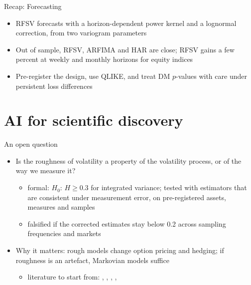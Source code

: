 \begin{frame}{Recap: Forecasting}
\itemsize{\small}
\begin{itemize}
    \item RFSV forecasts with a horizon-dependent power kernel and a lognormal correction, from two variogram parameters
    \item Out of sample, RFSV, ARFIMA and HAR are close; RFSV gains a few percent at weekly and monthly horizons for equity indices
    \item Pre-register the design, use QLIKE, and treat DM $p$-values with care under persistent loss differences
\end{itemize}
\end{frame}


\section{AI for scientific discovery}

\begin{frame}{An open question}
\itemsize{\small}
\begin{itemize}
    \item Is the roughness of volatility a property of the volatility process, or of the way we measure it?
    \begin{itemize}
        \item formal: $H_0$: $H \ge 0.3$ for integrated variance; tested with estimators that are consistent under measurement error, on pre-registered assets, measures and samples
        \item falsified if the corrected estimates stay below 0.2 across sampling frequencies and markets
    \end{itemize}
    \item Why it matters: rough models change option pricing and hedging; if roughness is an artefact, Markovian models suffice
    \begin{itemize}
        \item literature to start from: , , , , 
    \end{itemize}
\end{itemize}
\end{frame}

